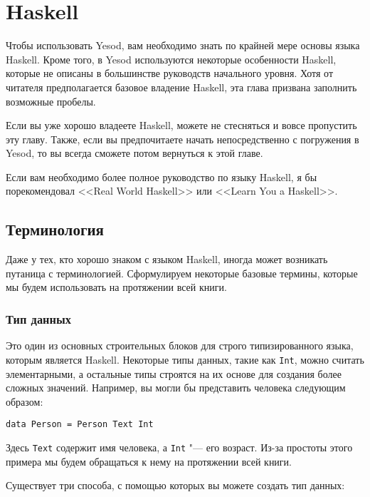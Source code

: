 \section{Haskell}

Чтобы использовать Yesod, вам необходимо знать по крайней мере основы языка Haskell. Кроме того, в Yesod используются некоторые особенности Haskell, которые не описаны в большинстве руководств начального уровня. Хотя от читателя предполагается базовое владение Haskell, эта глава призвана заполнить возможные пробелы.

Если вы уже хорошо владеете Haskell, можете не стесняться и вовсе пропустить эту главу. Также, если вы предпочитаете начать непосредственно с погружения в Yesod, то вы всегда сможете потом вернуться к этой главе.

Если вам необходимо более полное руководство по языку Haskell, я бы порекомендовал <<Real World Haskell>> или <<Learn You a Haskell>>.

\subsection{Терминология}

Даже у тех, кто хорошо знаком с языком Haskell, иногда может возникать путаница с терминологией. Сформулируем некоторые базовые термины, которые мы будем использовать на протяжении всей книги.

\subsubsection{Тип данных}

Это один из основных строительных блоков для строго типизированного языка, которым является Haskell. Некоторые типы данных, такие как \lstinline'Int', можно считать элементарными, а остальные типы строятся на их основе для создания более сложных значений. Например, вы могли бы представить человека следующим образом:

\begin{lstlisting}
data Person = Person Text Int
\end{lstlisting}

Здесь \lstinline'Text' содержит имя человека, а \lstinline'Int' "--- его возраст. Из-за простоты этого примера мы будем обращаться к нему на протяжении всей книги.

Существует три способа, с помощью которых вы можете создать тип данных:

